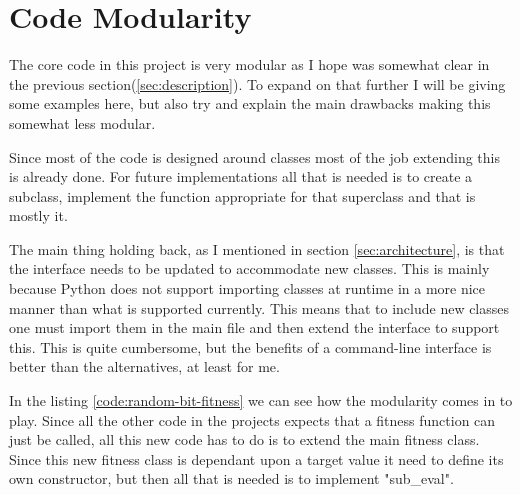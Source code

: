 \section{Code Modularity}\label{sec:modularity}
The core code in this project is very modular as I hope was somewhat clear in
the previous section(\ref{sec:description}). To expand on that further I will be
giving some examples here, but also try and explain the main drawbacks making
this somewhat less modular.

Since most of the code is designed around classes most of the job extending this
is already done. For future implementations all that is needed is to create a
subclass, implement the function appropriate for that superclass and that is
mostly it.

The main thing holding back, as I mentioned in section \ref{sec:architecture},
is that the interface needs to be updated to accommodate new classes. This is
mainly because Python does not support importing classes at runtime in a more
nice manner than what is supported currently. This means that to include new
classes one must import them in the main file and then extend the interface to
support this. This is quite cumbersome, but the benefits of a command-line
interface is better than the alternatives, at least for me.

In the listing \ref{code:random-bit-fitness} we can see how the modularity comes
in to play. Since all the other code in the projects expects that a fitness
function can just be called, all this new code has to do is to extend the main
fitness class. Since this new fitness class is dependant upon a target value it
need to define its own constructor, but then all that is needed is to implement
"sub\_eval".



